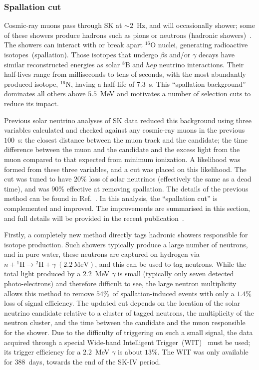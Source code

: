 \documentclass[aps,prd,reprint,superscriptaddress,floatfix,altaffilletter,nofootinbib]{revtex4-2}
\begin{document}
\subsubsection{Spallation cut} \label{sec:spallation}

Cosmic-ray muons pass through SK at ${\sim}2$~Hz, and will occasionally shower; some of these showers produce hadrons such as pions or neutrons (hadronic showers)~\cite{Li:2014sea, Li:2015kpa, Li:2015lxa}. The showers can interact with or break apart $\mathrm{^{16}O}$ nuclei, generating radioactive isotopes~(spallation).  Those isotopes that undergo $\beta$s and/or $\gamma$ decays have similar reconstructed energies as solar $\mathrm{^{8}B}$ and $hep$ neutrino interactions. Their half-lives range from milliseconds to tens of seconds, with the most abundantly produced isotope, $\mathrm{^{16}N}$, having a half-life of $7.3$~s. This ``spallation background'' dominates all others above $5.5$~MeV and motivates a number of selection cuts to reduce its impact.

Previous solar neutrino analyses of SK data reduced this background using three variables calculated and checked against any cosmic-ray muons in the previous $100$~s:  the closest distance between the muon track and the candidate; the time difference between the muon and the candidate and the excess light from the muon compared to that expected from minimum ionization. A likelihood was formed from these three variables, and a cut was placed on this likelihood. The cut was tuned to have $20\%$ loss of solar neutrinos (effectively the same as a dead time), and was $90\%$ effective at removing spallation. The details of
the previous method can be found in Ref.~\cite{Hosaka:2005um,Abe:2016nxk}.
In this analysis, the ``spallation cut'' is complemented and improved. The improvements are summarised in this section, and full details will be provided in the recent publication~\cite{scott2021}.

Firstly, a completely new method directly tags hadronic showers responsible for isotope production. Such showers typically produce a large number of neutrons, and in pure water, these neutrons are captured on hydrogen via $n + \mathrm{^{1}H} \rightarrow \mathrm{^{2}H} + \gamma~(2.2~\mathrm{MeV})$, and this can be used to tag neutrons.  While the total light produced by a $2.2$~MeV $\gamma$ is small (typically only seven detected photo-electrons) and therefore difficult to see, the large neutron multiplicity allows this method to remove $54\%$~of spallation-induced events with only a $1.4\%$ loss of signal efficiency.  The updated cut depends on the location of the 
solar neutrino candidate relative to a cluster of tagged neutrons, the multiplicity of the neutron cluster, and the time between the candidate and the muon responsible for the shower. Due to the difficulty of triggering on such a small signal, the data acquired through a special Wide-band Intelligent Trigger~(WIT)~\cite{Carminati:2015jna, Elnimr:2017nzi} 
must be used; its trigger efficiency for a $2.2$~MeV $\gamma$ is about $13\%$. The WIT was only available for $388$~days, towards the end of the SK-IV period.
\end{document}

